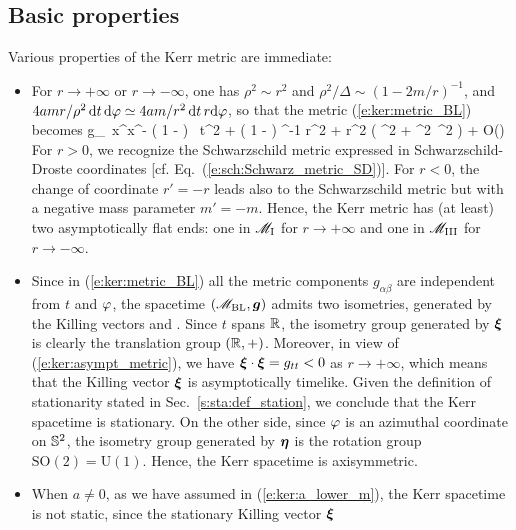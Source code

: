 \subsection{Basic properties} \label{s:ker:basic_prop}

Various properties of the Kerr metric are immediate:
\begin{itemize}
\item For $r\rightarrow+\infty$ or $r\rightarrow-\infty$, one has $\rho^2\sim r^2$ and
$\rho^2/\Delta \sim (1-2m/r)^{-1}$,
and $4 a m  r / \rho^2\,  \mathrm{d} t\, \mathrm{d}\varphi \simeq 4 a m/r^2 \,  \mathrm{d} t\, r\mathrm{d}\varphi$,
so that the metric (\ref{e:ker:metric_BL}) becomes
\be \label{e:ker:asympt_metric}
    g_{\mu\nu}\,  \D x^\mu \D x^\nu  \simeq  - \left( 1 -  \right) \, \D t^2
    + \left( 1 -  \right) ^{-1} \D r^2
    + r^2 \left( \D \th^2 + \sin^2\th  \, \D \ph^2 \right)
    + O\left(\right)
\ee
For $r>0$, we recognize the Schwarzschild metric expressed
in Schwarzschild-Droste coordinates [cf. Eq.~(\ref{e:sch:Schwarz_metric_SD})].
For $r<0$, the change of coordinate $r'=-r$ leads also to the Schwarzschild metric
but with a negative mass parameter $m'=-m$.
Hence, the Kerr metric has (at least) two asymptotically flat ends: one in
$\mathscr{M}_{\rm I}$ for $r\rightarrow + \infty$ and one in $\mathscr{M}_{\rm III}$ for
$r\rightarrow - \infty$.
\item Since in (\ref{e:ker:metric_BL}) all the metric components $g_{\alpha\beta}$ are independent from $t$ and $\varphi$, the
spacetime $(\mathscr{M}_{\rm BL},\bm{g})$ admits two isometries, generated by the Killing
vectors
\be
     \quad\mbox{and}\quad
    \encadre{\w{\eta} := \wpar_\ph}.
\ee
Since $t$ spans $\mathbb{R}$, the isometry group generated by $\bm{\xi}$ is clearly
the translation group $(\mathbb{R},+)$. Moreover, in
view of (\ref{e:ker:asympt_metric}), we have $\bm{\xi}\cdot\bm{\xi} = g_{tt} < 0$
as $r\rightarrow +\infty$, which means that the Killing vector $\bm{\xi}$
is asymptotically timelike. Given the definition of stationarity stated in
Sec.~\ref{s:sta:def_station}, we conclude that the Kerr spacetime is
stationary.
On the other side, since $\varphi$ is an azimuthal coordinate
on $\mathbb{S}^2$, the isometry group generated by $\bm{\eta}$ is the rotation
group $\mathrm{SO}(2) = \mathrm{U}(1)$.
Hence, the Kerr spacetime is axisymmetric.
\item When $a\not=0$, as we have assumed in (\ref{e:ker:a_lower_m}), the
Kerr spacetime is not static, since the stationary Killing vector $\bm{\xi}$

\end{itemize}

